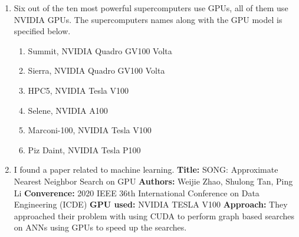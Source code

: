 \documentclass[a4paper, 12pt]{article}
\begin{document}
\begin{enumerate}
	\item Six out of the ten most powerful supercomputers use GPUs, all of them use NVIDIA GPUs. The supercomputers names along with the GPU model is specified below.
	\begin{enumerate}[label=\arabic*.]
		\item Summit, NVIDIA Quadro GV100 Volta
		\item Sierra, NVIDIA Quadro GV100 Volta
		\item HPC5, NVIDIA Tesla V100
		\item Selene, NVIDIA A100
		\item Marconi-100, NVIDIA Tesla V100
		\item Piz Daint, NVIDIA Tesla P100
	\end{enumerate}
	
	
	\item I found a paper related to machine learning.
	\newline \textbf{Title:} SONG: Approximate Nearest Neighbor Search on GPU
	\newline \textbf{Authors:} Weijie Zhao, Shulong Tan, Ping Li
	\newline \textbf{Converence:} 2020 IEEE 36th International Conference on Data Engineering (ICDE)
	\newline \textbf{GPU used:} NVIDIA TESLA V100
	\newline \textbf{Approach:} They approached their problem with using CUDA to perform graph based searches on ANNs using GPUs to speed up the searches.
\end{enumerate}
\newpage
\end{document}
